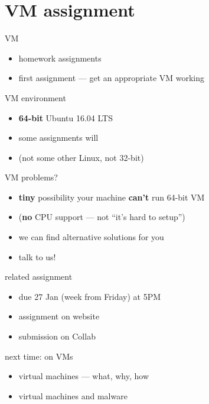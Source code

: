 \section{VM assignment}

\begin{frame}{VM}
    \begin{itemize}
    \item homework assignments
    \item first assignment --- get an appropriate VM working
    \end{itemize}
\end{frame}

\begin{frame}{VM environment}
    \begin{itemize}
    \item \textbf{64-bit} Ubuntu 16.04 LTS
    \item some assignments will 
    \item (not some other Linux, not 32-bit)
    \end{itemize}
\end{frame}

\begin{frame}{VM problems?}
    \begin{itemize}
    \item \textbf{tiny} possibility your machine \textbf{can't} run 64-bit VM
    \item (\textbf{no} CPU support --- not ``it's hard to setup'')
    \vspace{.5cm}
    \item we can find alternative solutions for you
    \item talk to us!
    \end{itemize}
\end{frame}

\begin{frame}{related assignment}
    \begin{itemize}
    \item due 27 Jan (week from Friday) at 5PM
    \item assignment on website
    \item submission on Collab
    \end{itemize}
\end{frame}

\begin{frame}{next time: on VMs}
    \begin{itemize}
    \item virtual machines --- what, why, how
    \item virtual machines and malware
    \end{itemize}
\end{frame}


